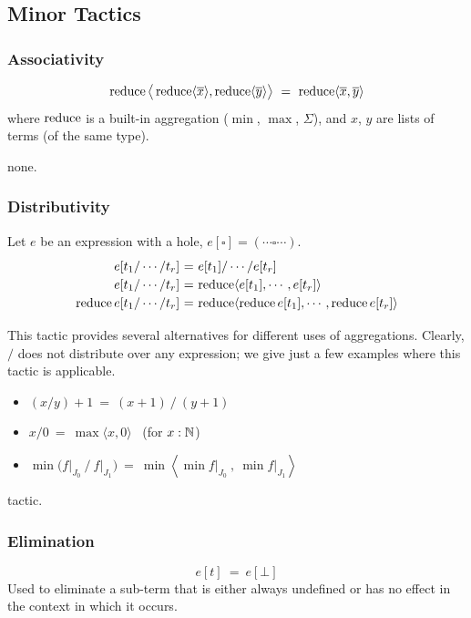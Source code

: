 \subsection{Minor Tactics}

\subsubsection{Associativity}
\[\operatorname{reduce}\big\langle \operatorname{reduce}\langle\overline x\rangle, \operatorname{reduce}\langle\overline y\rangle\big\rangle ~=~ \operatorname{reduce} \langle \overline x, \overline y\rangle\]
%
where $\operatorname{reduce}$ is a built-in aggregation ($\min$, $\max$, $\Sigma$), 
and $x$, $y$ are lists of terms (of the same type).

\Obligations none.

\subsubsection{Distributivity}
Let $e$ be an expression with a hole, $e[\square] = (\cdots \square \cdots)$.
%
\[\renewcommand\arraystretch{1.2}
  \begin{array}{@{}r@{~}c@{~}l@{}}
    e[t_1/\cdots/t_r] &=& e[t_1] / \cdots / e[t_r] \\
    e[t_1/\cdots/t_r] &=& \reduce\langle e[t_1],\cdots,e[t_r]\rangle \\
    \reduce e[t_1/\cdots/t_r] &=& \reduce\langle \reduce e[t_1],\cdots,\reduce e[t_r]\rangle
  \end{array}\]

This tactic provides several alternatives for different uses of aggregations.
Clearly, $\big/$ does not distribute over any expression; we give just a few examples
where this tactic is applicable.
\begin{itemize}
  \item $(x/y)+1 ~=~ (x+1)~/~(y+1)$
  \item $x/0 ~=~ \max\langle x,0\rangle$ ~(for $x:\mathbb{N}$)
  \item $\min \big(f\big|_{J_0}~\big/~f\big|_{J_1}\big) ~=~
         \min\left\langle \min f\big|_{J_0} ~,~ \min f\big|_{J_1}\right\rangle$
\end{itemize}

\Obligations tactic.

\subsubsection{Elimination}
\[e[t] ~=~ e[\bot]\]
%
Used to eliminate a sub-term that is either always undefined or has no effect
in the context in which it occurs.

